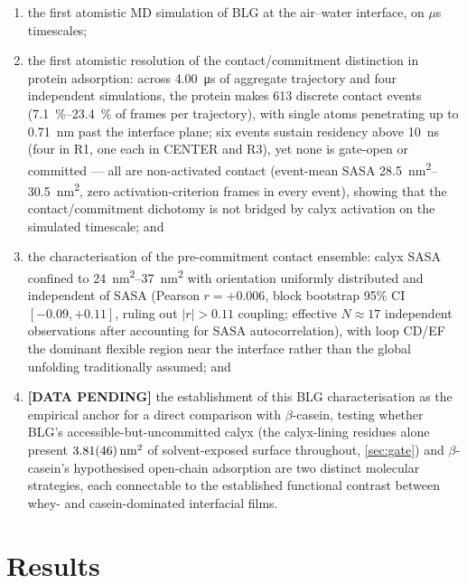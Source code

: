 \documentclass[11pt,a4paper]{article}
\begin{document}
\begin{enumerate}
  \item the first atomistic MD simulation of BLG at the air--water interface,
        on $\mu$s timescales;
  \item the first atomistic resolution of the contact/commitment
        distinction in protein adsorption: across \SI{4.00}{\micro\second}
        of aggregate trajectory and four independent simulations, the
        protein makes \num{613} discrete contact events
        (\SIrange{7.1}{23.4}{\percent} of frames per trajectory), with
        single atoms penetrating up to \SI{0.71}{\nano\metre} past the
        interface plane; six events sustain residency above
        \SI{10}{\nano\second} (four in R1, one each in CENTER and R3),
        yet none is gate-open or committed --- all are non-activated
        contact (event-mean SASA \SIrange{28.5}{30.5}{\nano\metre\squared},
        zero activation-criterion frames in every event), showing that
        the contact/commitment dichotomy is not bridged by calyx
        activation on the simulated timescale; and
  \item the characterisation of the pre-commitment contact ensemble:
        calyx SASA confined to \SIrange{24}{37}{\nano\metre\squared}
        with orientation uniformly distributed and independent of SASA
        (Pearson $r = +0.006$, block bootstrap 95\% CI $[-0.09, +0.11]$,
        ruling out $|r| > 0.11$ coupling; effective $N \approx 17$
        independent observations after accounting for SASA autocorrelation),
        with loop CD/EF the dominant flexible region near the interface
        rather than the global unfolding traditionally assumed; and
  \item \textbf{[DATA PENDING]} the establishment of this BLG
        characterisation as the empirical anchor for a direct comparison
        with $\beta$-casein, testing whether BLG's accessible-but-uncommitted
        calyx (the calyx-lining residues alone present
        $\SI{3.81 \pm 0.46}{\nano\metre\squared}$ of solvent-exposed
        surface throughout, \cref{sec:gate}) and $\beta$-casein's
        hypothesised open-chain adsorption are two distinct molecular
        strategies, each connectable to the established functional
        contrast between whey- and casein-dominated interfacial
        films\citep{Gochev2019JPCB,Foam4_2020,Mackie1999}.
\end{enumerate}

\section{Results}
\end{document}
